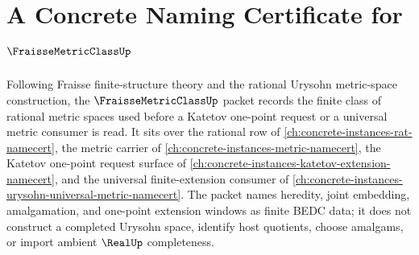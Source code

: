 \chapter{A Concrete Naming Certificate for $\FraisseMetricClassUp$}
\label{ch:concrete-instances-fraisse-metric-class-namecert}

Following Fraisse finite-structure theory and the rational Urysohn metric-space construction, the $\FraisseMetricClassUp$ packet records the finite class of rational metric spaces used before a Katetov one-point request or a universal metric consumer is read. It sits over the rational row of \autoref{ch:concrete-instances-rat-namecert}, the metric carrier of \autoref{ch:concrete-instances-metric-namecert}, the Katetov one-point request surface of \autoref{ch:concrete-instances-katetov-extension-namecert}, and the universal finite-extension consumer of \autoref{ch:concrete-instances-urysohn-universal-metric-namecert}. The packet names heredity, joint embedding, amalgamation, and one-point extension windows as finite BEDC data; it does not construct a completed Urysohn space, identify host quotients, choose amalgams, or import ambient $\RealUp$ completeness.

